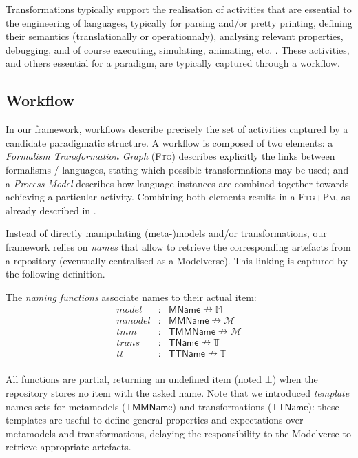 Transformations typically support the realisation of activities that are 
essential to the engineering of languages, typically for parsing and/or pretty 
printing, defining their semantics (translationally or operationnaly), 
analysing relevant properties, debugging, and of course executing, simulating, 
animating, etc. \cite{J:Lucio-Amrani-etAl:2014}. These activities, and others 
essential for a paradigm, are typically captured through a workflow.


\subsection{Workflow}
\label{sec:Workflow}

In our framework, workflows describe precisely the set of activities captured 
by a candidate paradigmatic structure. A workflow is composed of two elements: 
a \emph{Formalism Transformation Graph} (\textsc{Ftg}) describes explicitly the 
links between formalisms / languages, stating which possible transformations 
may be used; and a \emph{Process Model} describes how language instances are 
combined together towards achieving a particular activity. Combining both 
elements results in a \textsc{Ftg+Pm}, as already described in 
\cite{Mustafiz-etAl:2012,Lucio-Mustafiz-etAl:2013,TR:Lucio-Mustafiz-etAl:2012}.

Instead of directly manipulating (meta-)models and/or transformations, our 
framework relies on \emph{names} that allow to retrieve the corresponding 
artefacts from a repository (eventually centralised as a Modelverse). This 
linking is captured by the following definition.

\begin{Definition}
   The \emph{naming functions} associate names to their actual item:
   \begin{displaymath}
      \begin{array}{rcl}
         model  &\colon& \mathsf{MName} \nrightarrow \mathbb{M}\\
         mmodel &\colon& \mathsf{MMName} \nrightarrow \mathcal{M}\\
         tmm    &\colon& \mathsf{TMMName} \nrightarrow \mathcal{M}\\
         trans  &\colon& \mathsf{TName} \nrightarrow \mathbb{T}\\
         tt     &\colon& \mathsf{TTName} \nrightarrow \mathbb{T}\\
      \end{array}
   \end{displaymath}
\end{Definition}
\noindent
All functions are partial, returning an undefined item (noted $\bot$) when the 
repository stores no item with the asked name. Note that we introduced 
\emph{template} names sets for metamodels ($\mathsf{TMMName}$) and 
transformations ($\mathsf{TTName}$): these templates are useful to define 
general properties and expectations over metamodels and transformations, 
delaying the responsibility to the Modelverse to retrieve appropriate 
artefacts. 

